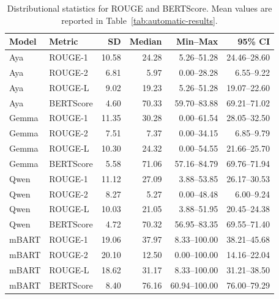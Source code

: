 \documentclass[11pt]{article}
\begin{document}
\begin{table}[t]
\centering
\scriptsize
\setlength{\tabcolsep}{5pt}
\begin{tabular}{llrrrr}
\hline
Model & Metric & SD & Median & Min--Max & 95\% CI \\
\hline
Aya   & ROUGE-1   & 10.58 & 24.28 & 5.26--51.28   & 24.46--28.60 \\
Aya   & ROUGE-2   & 6.81  & 5.97  & 0.00--28.28   & 6.55--9.22 \\
Aya   & ROUGE-L   & 9.02  & 19.23 & 5.26--51.28   & 19.07--22.60 \\
Aya   & BERTScore & 4.60  & 70.33 & 59.70--83.88  & 69.21--71.02 \\
Gemma & ROUGE-1   & 11.35 & 30.28 & 0.00--61.54   & 28.05--32.50 \\
Gemma & ROUGE-2   & 7.51  & 7.37  & 0.00--34.15   & 6.85--9.79 \\
Gemma & ROUGE-L   & 10.30 & 24.32 & 0.00--54.55   & 21.66--25.70 \\
Gemma & BERTScore & 5.58  & 71.06 & 57.16--84.79  & 69.76--71.94 \\
Qwen  & ROUGE-1   & 11.12 & 27.09 & 3.88--53.85   & 26.17--30.53 \\
Qwen  & ROUGE-2   & 8.27  & 5.27  & 0.00--48.48   & 6.00--9.24 \\
Qwen  & ROUGE-L   & 10.03 & 21.05 & 3.88--51.95   & 20.45--24.38 \\
Qwen  & BERTScore & 4.72  & 70.32 & 56.95--83.35  & 69.55--71.40 \\
mBART & ROUGE-1   & 19.06 & 37.97 & 8.33--100.00  & 38.21--45.68 \\
mBART & ROUGE-2   & 20.10 & 12.50 & 0.00--100.00  & 14.16--22.04 \\
mBART & ROUGE-L   & 18.62 & 31.17 & 8.33--100.00  & 31.21--38.50 \\
mBART & BERTScore & 8.40  & 76.16 & 60.94--100.00 & 76.00--79.29 \\
\hline
\end{tabular}
\caption{Distributional statistics for ROUGE and BERTScore. Mean values are reported in Table~\ref{tab:automatic-results}.}
\label{tab:reference-metric-distributions}
\end{table}
\end{document}
